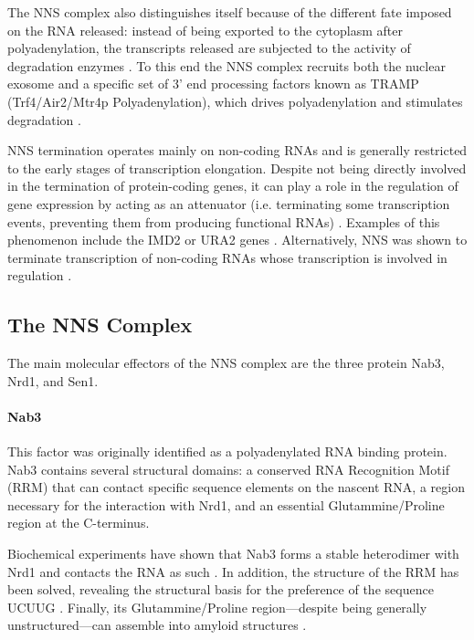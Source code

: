 The NNS complex also distinguishes itself because of the different fate imposed on the RNA released: instead of being exported to the cytoplasm after polyadenylation, the transcripts released are subjected to the activity of degradation enzymes \cite{vasiljeva:2006:nrd1}. 
To this end the NNS complex recruits both the nuclear exosome and a specific set of 3' end processing factors known as TRAMP (Trf4/Air2/Mtr4p Polyadenylation), which drives polyadenylation and stimulates degradation \cite{lacava:2005:rna, vasiljeva:2006:nrd1}.

NNS termination operates mainly on non-coding RNAs and is generally restricted to the early stages of transcription elongation. 
Despite not being directly involved in the termination of protein-coding genes, it can play a role in the regulation of gene expression by acting as an attenuator (i.e. terminating some transcription events, preventing them from producing functional RNAs) \cite{arigo:2006:regulation}. Examples of this phenomenon include the IMD2 or URA2 genes \citep{jenks:2008:properties}. Alternatively, NNS was shown to terminate transcription of non-coding RNAs whose transcription is involved in regulation \cite{thompson:2007:cytoplasmic}.

\subsection{The NNS Complex}

The main molecular effectors of the NNS complex are the three protein Nab3, Nrd1, and Sen1.


\paragraph{Nab3}

This factor was originally identified as a polyadenylated RNA binding protein. 
Nab3 contains several structural domains: a conserved RNA Recognition Motif (RRM) that can contact specific sequence elements on the nascent RNA, a region necessary for the interaction with Nrd1, and an essential Glutammine/Proline region at the C-terminus.

Biochemical experiments have shown that Nab3 forms a stable heterodimer with Nrd1 and contacts the RNA as such \cite{conrad:2000:yeast}. 
In addition, the structure of the RRM has been solved, revealing the structural basis for the preference of the sequence UCUUG \cite{lunde:2011:structural}. 
Finally, its Glutammine/Proline region---despite being generally unstructured---can assemble into amyloid structures \cite{orourke:2015:amyloidlike}.


